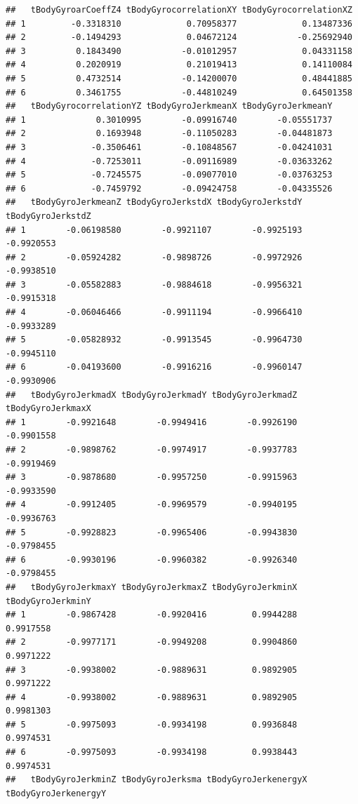 \documentclass[
]{article}
\begin{document}
\begin{verbatim}
##   tBodyGyroarCoeffZ4 tBodyGyrocorrelationXY tBodyGyrocorrelationXZ
## 1         -0.3318310             0.70958377             0.13487336
## 2         -0.1494293             0.04672124            -0.25692940
## 3          0.1843490            -0.01012957             0.04331158
## 4          0.2020919             0.21019413             0.14110084
## 5          0.4732514            -0.14200070             0.48441885
## 6          0.3461755            -0.44810249             0.64501358
##   tBodyGyrocorrelationYZ tBodyGyroJerkmeanX tBodyGyroJerkmeanY
## 1              0.3010995        -0.09916740        -0.05551737
## 2              0.1693948        -0.11050283        -0.04481873
## 3             -0.3506461        -0.10848567        -0.04241031
## 4             -0.7253011        -0.09116989        -0.03633262
## 5             -0.7245575        -0.09077010        -0.03763253
## 6             -0.7459792        -0.09424758        -0.04335526
##   tBodyGyroJerkmeanZ tBodyGyroJerkstdX tBodyGyroJerkstdY tBodyGyroJerkstdZ
## 1        -0.06198580        -0.9921107        -0.9925193        -0.9920553
## 2        -0.05924282        -0.9898726        -0.9972926        -0.9938510
## 3        -0.05582883        -0.9884618        -0.9956321        -0.9915318
## 4        -0.06046466        -0.9911194        -0.9966410        -0.9933289
## 5        -0.05828932        -0.9913545        -0.9964730        -0.9945110
## 6        -0.04193600        -0.9916216        -0.9960147        -0.9930906
##   tBodyGyroJerkmadX tBodyGyroJerkmadY tBodyGyroJerkmadZ tBodyGyroJerkmaxX
## 1        -0.9921648        -0.9949416        -0.9926190        -0.9901558
## 2        -0.9898762        -0.9974917        -0.9937783        -0.9919469
## 3        -0.9878680        -0.9957250        -0.9915963        -0.9933590
## 4        -0.9912405        -0.9969579        -0.9940195        -0.9936763
## 5        -0.9928823        -0.9965406        -0.9943830        -0.9798455
## 6        -0.9930196        -0.9960382        -0.9926340        -0.9798455
##   tBodyGyroJerkmaxY tBodyGyroJerkmaxZ tBodyGyroJerkminX tBodyGyroJerkminY
## 1        -0.9867428        -0.9920416         0.9944288         0.9917558
## 2        -0.9977171        -0.9949208         0.9904860         0.9971222
## 3        -0.9938002        -0.9889631         0.9892905         0.9971222
## 4        -0.9938002        -0.9889631         0.9892905         0.9981303
## 5        -0.9975093        -0.9934198         0.9936848         0.9974531
## 6        -0.9975093        -0.9934198         0.9938443         0.9974531
##   tBodyGyroJerkminZ tBodyGyroJerksma tBodyGyroJerkenergyX tBodyGyroJerkenergyY

\end{verbatim}
\end{document}

